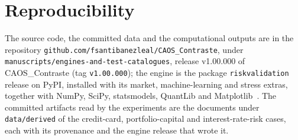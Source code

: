 \section{Reproducibility}
\label{sec:reproducibility}

The source code, the committed data and the computational outputs are in the repository \texttt{github.com/fsantibanezleal/CAOS\_Contraste}, under \texttt{manuscripts/engines-and-test-catalogues}, release v1.00.000 of CAOS\_Contraste (tag \texttt{v1.00.000}); the engine is the package \texttt{riskvalidation} release \inventoryVersion{} on PyPI, installed with its market, machine-learning and stress extras, together with NumPy, SciPy, statsmodels, QuantLib and Matplotlib~\citep{harris2020,virtanen2020,seabold2010,hunter2007}. The committed artifacts read by the experiments are the documents under \texttt{data/derived} of the credit-card, portfolio-capital and interest-rate-risk cases, each with its provenance and the engine release that wrote it. %

